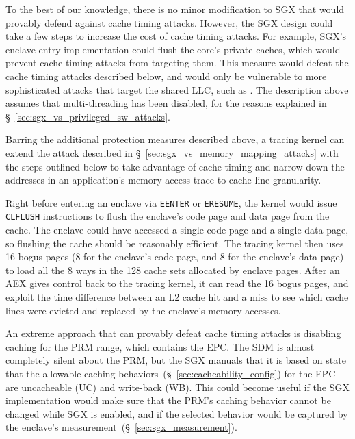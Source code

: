 To the best of our knowledge, there is no minor modification to SGX that would
provably defend against cache timing attacks. However, the SGX design could
take a few steps to increase the cost of cache timing attacks. For example,
SGX's enclave entry implementation could flush the core's private caches, which
would prevent cache timing attacks from targeting them. This measure would
defeat the cache timing attacks described below, and would only be vulnerable
to more sophisticated attacks that target the shared LLC, such as
\cite{yarom2013llctiming, liu2015llctiming}. The description above assumes that
multi-threading has been disabled, for the reasons explained in
\S~\ref{sec:sgx_vs_privileged_sw_attacks}.

Barring the additional protection measures described above, a tracing kernel
can extend the attack described in \S~\ref{sec:sgx_vs_memory_mapping_attacks}
with the steps outlined below to take advantage of cache timing and narrow down the
addresses in an application's memory access trace to cache line granularity.

Right before entering an enclave via \texttt{EENTER} or \texttt{ERESUME}, the
kernel would issue \texttt{CLFLUSH} instructions to flush the enclave's code
page and data page from the cache. The enclave could have accessed a single
code page and a single data page, so flushing the cache should be reasonably
efficient. The tracing kernel then uses 16 bogus pages (8 for the enclave's
code page, and 8 for the enclave's data page) to load all the 8 ways in the 128
cache sets allocated by enclave pages. After an AEX gives control back to the
tracing kernel, it can read the 16 bogus pages, and exploit the time difference
between an L2 cache hit and a miss to see which cache lines were evicted and
replaced by the enclave's memory accesses.


An extreme approach that can provably defeat cache timing attacks is disabling
caching for the PRM range, which contains the EPC. The SDM is almost completely
silent about the PRM, but the SGX manuals that it is based on state that
the allowable caching behaviors~(\S~\ref{sec:cacheability_config}) for the EPC
are uncacheable (UC) and write-back (WB). This could become useful if the SGX
implementation would make sure that the PRM's caching behavior cannot be
changed while SGX is enabled, and if the selected behavior would be captured by
the enclave's measurement~(\S~\ref{sec:sgx_measurement}).
